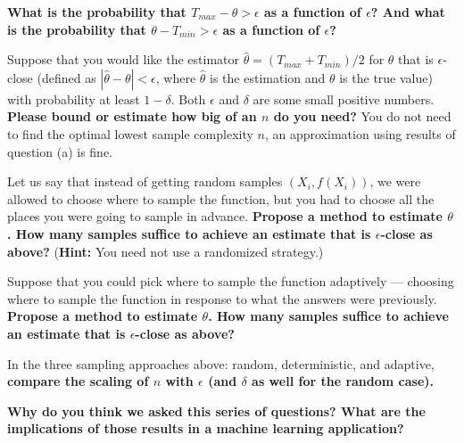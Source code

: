 \documentclass[preview]{standalone}
\begin{document}
\begin{Parts}

\Part \textbf{What is the probability that $T_{max} - \theta > \epsilon$ as a
function of $\epsilon$? And what is the probability that $\theta - T_{min} > \epsilon$ as a
function of $\epsilon$?}



\Part Suppose that you would like the estimator $\hat{\theta} = (T_{max} + T_{min}) / 2$ for $\theta$ that is $\epsilon$-close (defined as $|\hat{\theta} - \theta| < \epsilon$, where $\hat{\theta}$ is the estimation and $\theta$ is the true value) with probability at least
$1-\delta$. Both $\epsilon$ and $\delta$ are some small positive numbers. \textbf{Please bound or estimate how big of an $n$ do you need? } You do not need to find the optimal lowest sample complexity $n$, an approximation using results of question (a) is fine. 



\Part Let us say that instead of getting random samples $(X_i, f(X_i))$,
we were allowed to choose where to sample the function, but you had to
choose all the places you were going to sample in advance. \textbf{Propose a
method to estimate $\theta$. How many samples suffice to achieve an
estimate that is $\epsilon$-close as above?} ({\bf Hint:} You need not use a randomized
strategy.)  



\Part Suppose that you could pick where to sample the function
adaptively --- choosing where to sample the function in response to
what the answers were previously. \textbf{Propose a method to estimate
$\theta$. How many samples suffice to achieve an estimate that is
$\epsilon$-close as above?}



\Part In the three sampling approaches above: random, deterministic, and adaptive, \textbf{compare the scaling of $n$ with $\epsilon$ (and $\delta$ as well for the random case). }





\Part \textbf{Why do you think we asked this series of questions? What are the implications of those results in a machine learning application?}


















\end{Parts}
\end{document}
